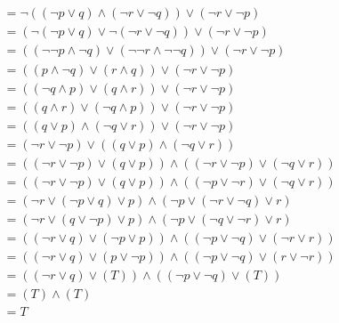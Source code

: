 \documentclass[11pt]{article}
\begin{document}
\subsection{} %
\begin{align*}
&= \neg{((\neg{p} \lor q) \land (\neg{r} \lor \neg{q}))} \lor (\neg{r} \lor \neg{p}) \\
&= (\neg{(\neg{p} \lor q)} \lor \neg{(\neg{r} \lor \neg{q})}) \lor (\neg{r} \lor \neg{p}) \tag*{De Morgan's} \\
&= ((\neg{\neg{p}} \land \neg{q}) \lor (\neg{\neg{r}} \land \neg{\neg{q}})) \lor (\neg{r} \lor \neg{p}) \tag*{De Morgan's x2} \\
&= ((p \land \neg{q}) \lor (r \land q)) \lor (\neg{r} \lor \neg{p}) \tag*{Double Negation x3} \\
&= ((\neg{q} \land p) \lor (q \land r)) \lor (\neg{r} \lor \neg{p}) \tag*{Commutativity x2} \\
&= ((q \land r) \lor (\neg{q} \land p)) \lor (\neg{r} \lor \neg{p}) \tag*{Commutativity x2} \\
&= ((q \lor p) \land (\neg{q} \lor r)) \lor (\neg{r} \lor \neg{p}) \tag*{Factoring} \\
&= (\neg{r} \lor \neg{p}) \lor ((q \lor p) \land (\neg{q} \lor r))  \tag*{Commutativity} \\
&= ((\neg{r} \lor \neg{p}) \lor (q \lor p)) \land ((\neg{r} \lor \neg{p}) \lor (\neg{q} \lor r)) \tag*{Distributitive} \\
&= ((\neg{r} \lor \neg{p}) \lor (q \lor p)) \land ((\neg{p} \lor \neg{r}) \lor (\neg{q} \lor r)) \tag*{Commutativity} \\
&= (\neg{r} \lor (\neg{p} \lor q) \lor p) \land (\neg{p} \lor (\neg{r} \lor \neg{q}) \lor r) \tag*{Associativity x2} \\
&= (\neg{r} \lor (q \lor \neg{p}) \lor p) \land (\neg{p} \lor (\neg{q} \lor \neg{r}) \lor r) \tag*{Commutativity x2} \\
&= ((\neg{r} \lor q) \lor (\neg{p} \lor p)) \land ((\neg{p} \lor \neg{q}) \lor (\neg{r} \lor r)) \tag*{Associativity x2} \\
&= ((\neg{r} \lor q) \lor (p \lor \neg{p})) \land ((\neg{p} \lor \neg{q}) \lor (r \lor \neg{r})) \tag*{Commutativity x2} \\
&= ((\neg{r} \lor q) \lor (T)) \land ((\neg{p} \lor \neg{q}) \lor (T)) \tag*{Negation x2} \\
&= (T) \land (T) \tag*{Domination x2} \\
&= T \tag*{Tautology} \\
\end{align*}
\end{document}
